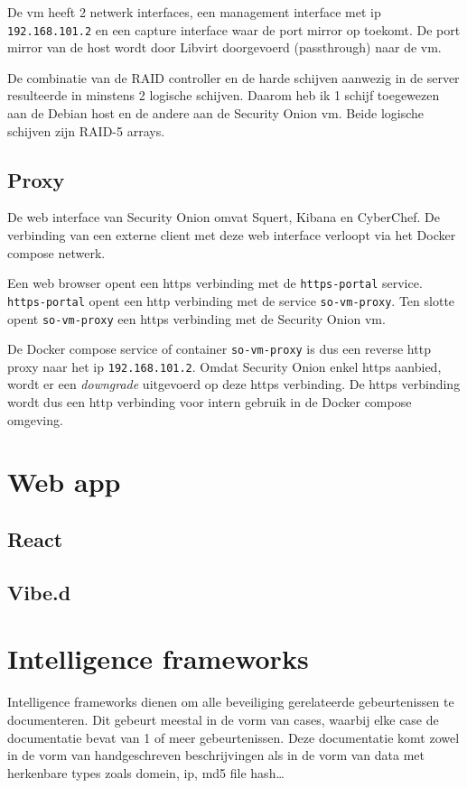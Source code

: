 \documentclass[a4paper,12pt]{report}
\begin{document}
De vm heeft 2 netwerk interfaces, een management interface met ip \lstinline|192.168.101.2| en een capture interface waar de port mirror op toekomt.
De port mirror van de host wordt door Libvirt doorgevoerd (passthrough) naar de vm.

De combinatie van de RAID controller en de harde schijven aanwezig in de server resulteerde in minstens 2 logische schijven.
Daarom heb ik 1 schijf toegewezen aan de Debian host en de andere aan de Security Onion vm.
Beide logische schijven zijn RAID-5 arrays.

\subsection{Proxy}
De web interface van Security Onion omvat Squert, Kibana en CyberChef.
De verbinding van een externe client met deze web interface verloopt via het Docker compose netwerk.

Een web browser opent een https verbinding met de \lstinline|https-portal| service.
\lstinline|https-portal| opent een http verbinding met de service \lstinline|so-vm-proxy|.
Ten slotte opent \lstinline|so-vm-proxy| een https verbinding met de Security Onion vm.

De Docker compose service of container \lstinline|so-vm-proxy| is dus een reverse http proxy naar het ip \lstinline|192.168.101.2|.
Omdat Security Onion enkel https aanbied, wordt er een \emph{downgrade} uitgevoerd op deze https verbinding.
De https verbinding wordt dus een http verbinding voor intern gebruik in de Docker compose omgeving.

\section{Web app}
\subsection{React}
\subsection{Vibe.d}

\section{Intelligence frameworks}
Intelligence frameworks dienen om alle beveiliging gerelateerde gebeurtenissen te documenteren.
Dit gebeurt meestal in de vorm van cases, waarbij elke case de documentatie bevat van 1 of meer gebeurtenissen.
Deze documentatie komt zowel in de vorm van handgeschreven beschrijvingen als in de vorm van data met herkenbare types zoals domein, ip, md5 file hash\dots
\end{document}
